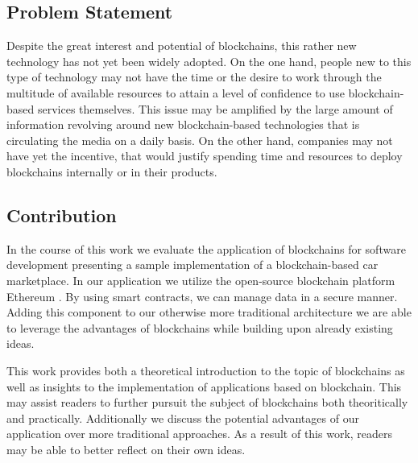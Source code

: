 \subsection{Problem Statement}
Despite the great interest and potential of blockchains, this rather new technology has not yet been widely adopted. On the one hand, people new to this type of technology may not have the time or the desire to work through the multitude of available resources to attain a level of confidence to use blockchain-based services themselves. This issue may be amplified by the large amount of information revolving around new blockchain-based technologies that is circulating the media on a daily basis. On the other hand, companies may not have yet the incentive, that would justify spending time and resources to deploy blockchains internally or in their products.

\subsection{Contribution}
In the course of this work we evaluate the application of blockchains for software development presenting a sample implementation of a blockchain-based car marketplace. In our application we utilize the open-source blockchain platform Ethereum \cite{Ethereum}. By using smart contracts, we can manage data in a secure manner. Adding this component to our otherwise more traditional architecture we are able to leverage the advantages of blockchains while building upon already existing ideas.

This work provides both a theoretical introduction to the topic of blockchains as well as insights to the implementation of applications based on blockchain. This may assist readers to further pursuit the subject of blockchains both theoritically and practically. Additionally we discuss the potential advantages of our application over more traditional approaches. As a result of this work, readers may be able to better reflect on their own ideas.

